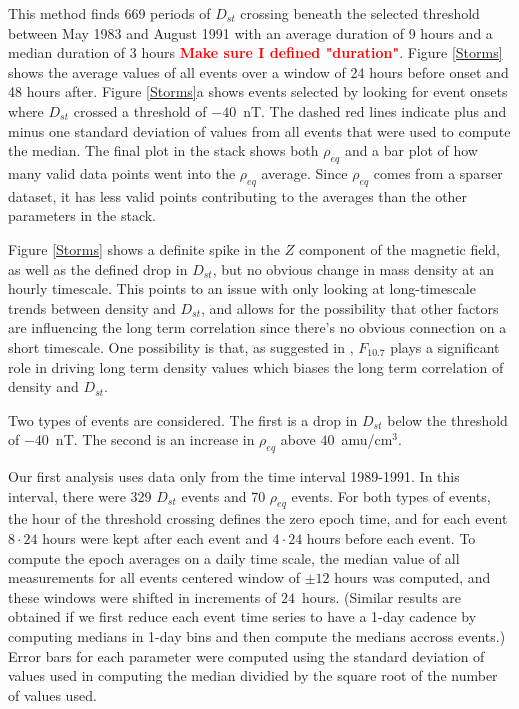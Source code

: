 \documentclass[10pt,twocolumn]{article}
\newcommand{\vinote}[1]{\textcolor{red}{\textbf{#1}}} %
\newcommand{\inote}[1]{\textcolor{blue}{\textbf{#1}}} %
\def\note#1\par{\textcolor{blue}{\textbf{#1}}\\}
\begin{document}
This method finds 669 periods of $D_{st}$ crossing beneath the selected threshold between May 1983 and August 1991 with an average duration of 9 hours and a median duration of 3 hours \vinote{Make sure I defined "duration"}. Figure \ref{Storms} shows the average values of all events over a window of 24 hours before onset and 48 hours after. Figure \ref{Storms}a shows events selected by looking for event onsets where $D_{st}$ crossed a threshold of $-40$~nT. The dashed red lines indicate plus and minus one standard deviation of values from all events that were used to compute the median. The final plot in the stack shows both $\rho_{eq}$ and a bar plot of how many valid data points went into the $\rho_{eq}$ average. Since $\rho_{eq}$ comes from a sparser dataset, it has less valid points contributing to the averages than the other parameters in the stack. 

Figure \ref{Storms} shows a definite spike in the $Z$ component of the magnetic field, as well as the defined drop in $D_{st}$, but no obvious change in mass density at an hourly timescale. This points to an issue with only looking at long-timescale trends between density and $D_{st}$, and allows for the possibility that other factors are influencing the long term correlation since there's no obvious connection on a short timescale. One possibility is that, as suggested in \cite{Takahashi2010}, $F_{10.7}$ plays a significant role in driving long term density values which biases the long term correlation of density and $D_{st}$.

Two types of events are considered. The first is a drop in $D_{st}$ below the threshold of $-40$~nT.  The second is an increase in $\rho_{eq}$ above $40$~amu/cm$^3$.

Our first analysis uses data only from the time interval 1989-1991.  In this interval, there were 329 $D_{st}$ events and 70 $\rho_{eq}$ events.  For both types of events, the hour of the threshold crossing defines the zero epoch time, and for each event $8\cdot24$ hours were kept after each event and $4\cdot24$ hours before each event.  To compute the epoch averages on a daily time scale, the median value of all measurements for all events centered window of $\pm 12$ hours was computed, and these windows were shifted in increments of $24$~hours. (Similar results are obtained if we first reduce each event time series to have a 1-day cadence by computing medians in 1-day bins and then compute the medians accross events.)  Error bars for each parameter were computed using the standard deviation of values used in computing the median dividied by the square root of the number of values used.
\end{document}
